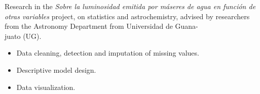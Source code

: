 \documentclass[]{friggeri-cv}
\begin{document}
\begin{entrylist}
{\begin{tabular}{r}
	\end{tabular}\hspace{0.4cm}
    }
    {\vspace{-0.98cm}}
    { }
    {Research in the \textsl{Sobre la luminosidad emitida por máseres de agua en función de otras variables} project, on statistics and astrochemistry, advised by researchers from the Astronomy Department from Universidad de Guana-\\juato (UG).
    \begin{itemize}
	\item Data cleaning, detection and imputation of missing values.
	\item Descriptive model design.
	\item Data visualization.
\end{itemize}}%
\end{entrylist}
\vspace{-0.65cm}
\end{document}
